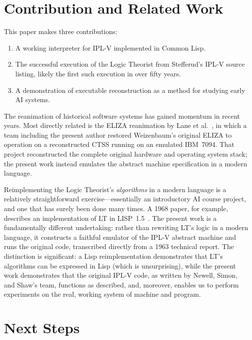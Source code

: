 \documentclass[journal]{IEEEtran}
\begin{document}
\section{Contribution and Related Work}
\label{sec:related}

This paper makes three contributions:

\begin{enumerate}
\item A working interpreter for IPL-V implemented in Common Lisp.
\item The successful execution of the Logic Theorist from Stefferud’s IPL-V source listing, likely the first such execution in over fifty years.
\item A demonstration of executable reconstruction as a method for studying early AI systems.
\end{enumerate}

The reanimation of historical software systems has gained momentum in
recent years. Most directly related is the ELIZA reanimation by Lane
et al.~\cite{lane2025eliza}, in which a team including the present
author restored Weizenbaum's original ELIZA to operation on a
reconstructed CTSS running on an emulated IBM~7094. That project
reconstructed the complete original hardware and operating system
stack; the present work instead emulates the abstract machine
specification in a modern language.

Reimplementing the Logic Theorist's \textit{algorithms} in a modern
language is a relatively straightforward exercise---essentially an
introductory AI course project, and one that has surely been done many
times. A 1968 paper, for example, describes an implementation of LT in
LISP~1.5~\cite{millstein1968logic}. The present work is a
fundamentally different undertaking: rather than rewriting LT's logic
in a modern language, it constructs a faithful emulator of the IPL-V
abstract machine and runs the original code, transcribed directly from
a 1963 technical report. The distinction is significant: a Lisp
reimplementation demonstrates that LT's algorithms can be expressed in
Lisp (which is unsurprising), while the present work demonstrates that
the original IPL-V code, as written by Newell, Simon, and Shaw's team,
functions as described, and, moreover, enables us to perform
experiments on the real, working system of machine and program.

\section{Next Steps}
\label{sec:next}
\end{document}
